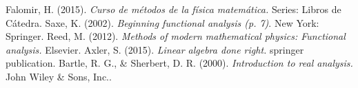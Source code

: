 

\usepackage{fancyhdr}%
\pagestyle{fancy}%
\fancyhead{}
\fancyhead[R]{\footnotesize{\thepage}}
\fancyfoot{}
\usepackage{fourier-orns}

\renewcommand\footrule{%
\hrulefill
\raisebox{-2.1pt}
{\quad\decosix\quad}%
\hrulefill}
\newcommand{\inner}[2]{\langle #1 , #2 \rangle}
\newcommand{\metric}[2]{\rho(#1,#2)}	
\newcommand{\seque}[2]{\{ #1_{#2} \}}


\begin{titlepage}









\begin{thebibliography}{00}
 Falomir, H. (2015). \textit{Curso de métodos de la física matemática.} Series: Libros de Cátedra.
 Saxe, K. (2002). \textit{Beginning functional analysis (p. 7)}. New York: Springer.
 Reed, M. (2012). \textit{Methods of modern mathematical physics: Functional analysis.} Elsevier.
 Axler, S. (2015). \textit{Linear algebra done right.} springer publication.
 Bartle, R. G., \& Sherbert, D. R. (2000). \textit{Introduction to real analysis.} John Wiley \& Sons, Inc..
\end{thebibliography}



\end{titlepage}

